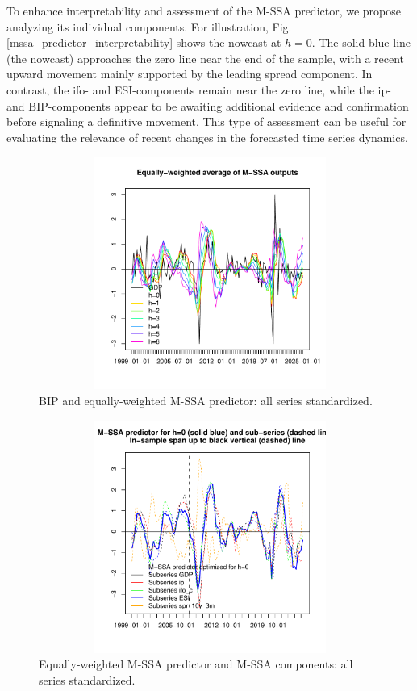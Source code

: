 \documentclass[a4paper]{article}
\begin{document}
To enhance interpretability and assessment of the M-SSA predictor, we propose analyzing its individual components. For illustration, Fig. \eqref{mssa_predictor_interpretability} shows the nowcast at $h=0$. The solid blue line (the nowcast) approaches the zero line near the end of the sample, with a recent upward movement mainly supported by the leading spread component. In contrast, the ifo- and ESI-components remain near the zero line, while the ip- and BIP-components appear to be awaiting additional evidence and confirmation before signaling a definitive movement.  This type of assessment can be useful for evaluating the relevance of recent changes in the forecasted time series dynamics.
\begin{figure}[H]\begin{center}\includegraphics[height=3in, width=4.5in]{./Figures/mssa_predictor.pdf}\caption{BIP and equally-weighted M-SSA predictor: all series standardized.\label{mssa_predictor}}\end{center}\end{figure}\begin{figure}[H]\begin{center}\includegraphics[height=3in, width=4.5in]{./Figures/mssa_predictor_interpretability.pdf}\caption{Equally-weighted M-SSA predictor and M-SSA components: all series standardized.\label{mssa_predictor_interpretability}}\end{center}\end{figure}
\end{document}
